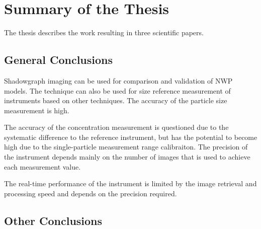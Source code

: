 \chapter{Summary of the Thesis}
\label{chap:summary}

The thesis describes the work resulting in three scientific papers.

\section{General Conclusions}

Shadowgraph imaging can be used for comparison and validation of NWP models. The technique can also be used for size reference measurement of instruments based on other techniques. The accuracy of the particle size measurement is high. 

The accuracy of the concentration measurement is questioned due to the systematic difference to the reference instrument, but has the potential to become high due to the single-particle measurement range calibraiton. The precision of the instrument depends mainly on the number of images that is used to achieve each measurement value. 

The real-time performance of the instrument is limited by the image retrieval and processing speed and depends on the precision required.

\section{Other Conclusions}

